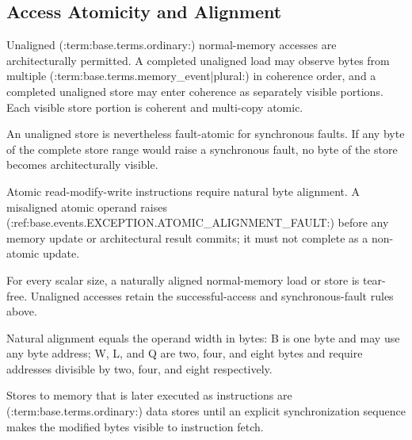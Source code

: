 \subsection{Access Atomicity and Alignment}
Unaligned (:term:base.terms.ordinary:) normal-memory accesses are architecturally permitted. A completed unaligned load may observe bytes from
multiple (:term:base.terms.memory_event|plural:) in coherence order, and a completed unaligned store may enter coherence as separately visible portions. Each
visible store portion is coherent and multi-copy atomic.

An unaligned store is nevertheless fault-atomic for synchronous faults. If any byte of the complete store range
would raise a synchronous fault, no byte of the store becomes architecturally visible.

Atomic read-modify-write instructions require natural byte alignment. A misaligned atomic operand raises
(:ref:base.events.EXCEPTION.ATOMIC_ALIGNMENT_FAULT:) before any memory update or architectural result
commits; it must not complete as a non-atomic update.

For every scalar size, a naturally aligned normal-memory load or store is tear-free. Unaligned accesses retain the
successful-access and synchronous-fault rules above.

Natural alignment equals the operand width in bytes: B is one byte and may use any byte address; W, L, and Q are
two, four, and eight bytes and require addresses divisible by two, four, and eight respectively.

Stores to memory that is later executed as instructions are (:term:base.terms.ordinary:) data stores until an explicit synchronization
sequence makes the modified bytes visible to instruction fetch.
